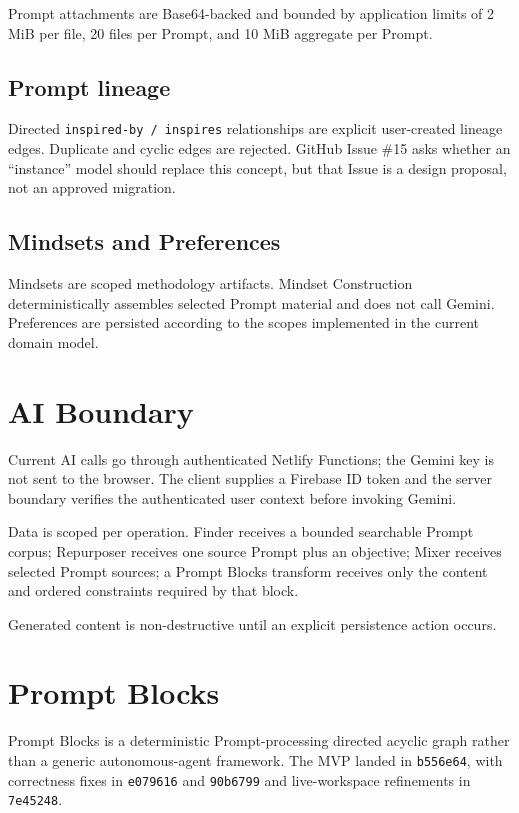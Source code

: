 \documentclass[11pt]{article}
\newcommand{\code}[1]{\texttt{#1}}
\newcommand{\commit}[1]{\texttt{#1}}
\begin{document}
Prompt attachments are Base64-backed and bounded by application limits of 2 MiB
per file, 20 files per Prompt, and 10 MiB aggregate per Prompt.

\subsection{Prompt lineage}

Directed \code{inspired-by / inspires} relationships are explicit user-created
lineage edges. Duplicate and cyclic edges are rejected. GitHub Issue \#15 asks
whether an ``instance'' model should replace this concept, but that Issue is a
design proposal, not an approved migration.

\subsection{Mindsets and Preferences}

Mindsets are scoped methodology artifacts. Mindset Construction deterministically
assembles selected Prompt material and does not call Gemini. Preferences are
persisted according to the scopes implemented in the current domain model.

\section{AI Boundary}

Current AI calls go through authenticated Netlify Functions; the Gemini key is
not sent to the browser. The client supplies a Firebase ID token and the server
boundary verifies the authenticated user context before invoking Gemini.

Data is scoped per operation. Finder receives a bounded searchable Prompt corpus;
Repurposer receives one source Prompt plus an objective; Mixer receives selected
Prompt sources; a Prompt Blocks transform receives only the content and ordered
constraints required by that block.

Generated content is non-destructive until an explicit persistence action occurs.

\section{Prompt Blocks}

Prompt Blocks is a deterministic Prompt-processing directed acyclic graph rather
than a generic autonomous-agent framework. The MVP landed in \commit{b556e64},
with correctness fixes in \commit{e079616} and \commit{90b6799} and live-workspace
refinements in \commit{7e45248}.
\end{document}
